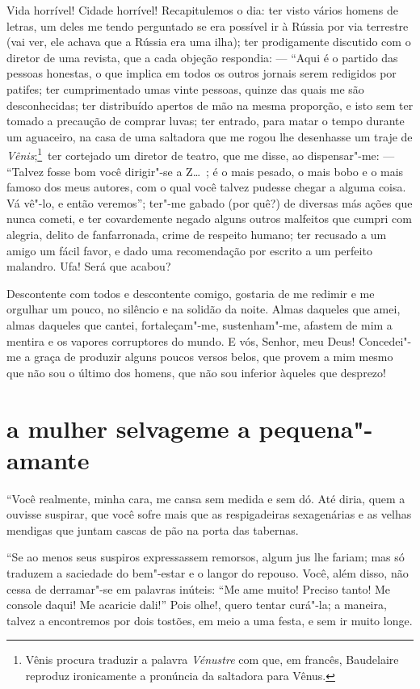 Vida horrível! Cidade horrível! Recapitulemos o dia: ter visto vários
homens de letras, um deles me tendo perguntado se era possível
ir à Rússia por via terrestre (vai ver, ele achava que a Rússia era
uma ilha); ter prodigamente discutido com o diretor de uma revista,
que a cada objeção respondia: --- ``Aqui é o partido das
pessoas honestas, o que implica em todos os outros
jornais serem redigidos por patifes; ter cumprimentado umas vinte
pessoas, quinze das quais me são desconhecidas; ter distribuído
apertos de mão na mesma proporção, e isto sem ter tomado a precaução de
comprar luvas; ter entrado, para matar o tempo durante um aguaceiro,
na casa de uma saltadora que me rogou lhe desenhasse um traje de \textit{
Vênis};\protect\footnote{  Vênis procura traduzir a palavra \textit{Vénustre} com que, em francês,
Baudelaire reproduz ironicamente a pronúncia da saltadora para Vênus.}~ter cortejado um diretor de teatro, que me
disse, ao dispensar"-me: --- “Talvez fosse bom você
dirigir"-se a Z\ldots\ ; é o mais pesado, o mais bobo e o mais famoso dos
meus autores, com o qual você talvez pudesse chegar a alguma coisa. Vá
vê"-lo, e então veremos''; ter"-me gabado (por
quê?) de diversas más ações que nunca cometi, e ter covardemente negado
alguns outros malfeitos que cumpri com alegria, delito de fanfarronada,
crime de respeito humano; ter recusado a um amigo um fácil favor, e
dado uma recomendação por escrito a um perfeito malandro. Ufa! Será que
acabou?

Descontente com todos e descontente comigo, gostaria de me redimir
e me orgulhar um pouco, no silêncio e na solidão da noite. Almas
daqueles que amei, almas daqueles que cantei, fortaleçam"-me,
sustenham"-me, afastem de mim a mentira e os vapores corruptores do
mundo. E vós, Senhor, meu Deus! Concedei"-me a graça de produzir alguns
poucos versos belos, que provem a mim mesmo que não sou o último dos
homens, que não sou inferior àqueles que desprezo!

\quebra\section[A mulher selvagem e a pequena"-amante]{a mulher selvagem\break e a pequena"-amante}

“Você realmente, minha cara, me cansa sem medida e
sem dó. Até diria, quem a ouvisse suspirar, que você sofre mais que
as respigadeiras sexagenárias e as velhas mendigas que juntam cascas de
pão na porta das tabernas.

“Se ao menos seus suspiros expressassem remorsos, algum
jus lhe fariam; mas só traduzem a saciedade do bem"-estar e o
langor do repouso. Você, além disso, não cessa de derramar"-se em
palavras inúteis: ``Me ame muito! Preciso tanto! Me
console daqui! Me acaricie dali!'' Pois olhe!, quero tentar
curá"-la; a maneira, talvez a encontremos por dois tostões, em meio a
uma festa, e sem ir muito longe.

